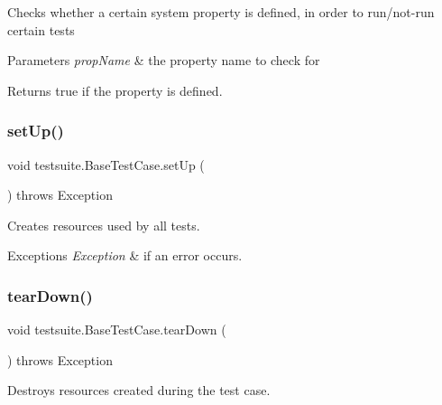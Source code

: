 Checks whether a certain system property is defined, in order to run/not-\/run certain tests


\begin{DoxyParams}{Parameters}
{\em prop\+Name} & the property name to check for\\
\hline
\end{DoxyParams}
\begin{DoxyReturn}{Returns}
true if the property is defined. 
\end{DoxyReturn}
\mbox{\label{classtestsuite_1_1_base_test_case_a195f5d285c7979328734606d08ad15b1}} 
\subsubsection{\texorpdfstring{set\+Up()}{setUp()}}
{\footnotesize\ttfamily void testsuite.\+Base\+Test\+Case.\+set\+Up (\begin{DoxyParamCaption}{ }\end{DoxyParamCaption}) throws Exception}

Creates resources used by all tests.


\begin{DoxyExceptions}{Exceptions}
{\em Exception} & if an error occurs. \\
\hline
\end{DoxyExceptions}
\mbox{\label{classtestsuite_1_1_base_test_case_a51c7d76ab24b0c966f956250fd7a4f52}} 
\subsubsection{\texorpdfstring{tear\+Down()}{tearDown()}}
{\footnotesize\ttfamily void testsuite.\+Base\+Test\+Case.\+tear\+Down (\begin{DoxyParamCaption}{ }\end{DoxyParamCaption}) throws Exception}

Destroys resources created during the test case. \mbox{\label{classtestsuite_1_1_base_test_case_a4098e9a480c1907875ded976cdbc81a3}} 
